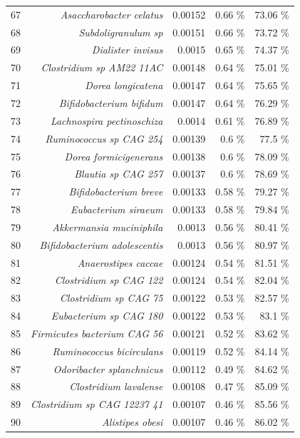 \documentclass{article}
\begin{document}
\begin{table}
\begin{centering}
\begin{tabular}{|r|r|r|r|r|}
  67 & \textit{Asaccharobacter celatus} & 0.00152 & 0.66 \% & 73.06 \% \\
  68 & \textit{Subdoligranulum sp} & 0.00151 & 0.66 \% & 73.72 \% \\
  69 & \textit{Dialister invisus} & 0.0015 & 0.65 \% & 74.37 \% \\
  70 & \textit{Clostridium sp AM22 11AC} & 0.00148 & 0.64 \% & 75.01 \% \\
  71 & \textit{Dorea longicatena} & 0.00147 & 0.64 \% & 75.65 \% \\
  72 & \textit{Bifidobacterium bifidum} & 0.00147 & 0.64 \% & 76.29 \% \\
  73 & \textit{Lachnospira pectinoschiza} & 0.0014 & 0.61 \% & 76.89 \% \\
  74 & \textit{Ruminococcus sp CAG 254} & 0.00139 & 0.6 \% & 77.5 \% \\
  75 & \textit{Dorea formicigenerans} & 0.00138 & 0.6 \% & 78.09 \% \\
  76 & \textit{Blautia sp CAG 257} & 0.00137 & 0.6 \% & 78.69 \% \\
  77 & \textit{Bifidobacterium breve} & 0.00133 & 0.58 \% & 79.27 \% \\
  78 & \textit{Eubacterium siraeum} & 0.00133 & 0.58 \% & 79.84 \% \\
  79 & \textit{Akkermansia muciniphila} & 0.0013 & 0.56 \% & 80.41 \% \\
  80 & \textit{Bifidobacterium adolescentis} & 0.0013 & 0.56 \% & 80.97 \% \\
  81 & \textit{Anaerostipes caccae} & 0.00124 & 0.54 \% & 81.51 \% \\
  82 & \textit{Clostridium sp CAG 122} & 0.00124 & 0.54 \% & 82.04 \% \\
  83 & \textit{Clostridium sp CAG 75} & 0.00122 & 0.53 \% & 82.57 \% \\
  84 & \textit{Eubacterium sp CAG 180} & 0.00122 & 0.53 \% & 83.1 \% \\
  85 & \textit{Firmicutes bacterium CAG 56} & 0.00121 & 0.52 \% & 83.62 \% \\
  86 & \textit{Ruminococcus bicirculans} & 0.00119 & 0.52 \% & 84.14 \% \\
  87 & \textit{Odoribacter splanchnicus} & 0.00112 & 0.49 \% & 84.62 \% \\
  88 & \textit{Clostridium lavalense} & 0.00108 & 0.47 \% & 85.09 \% \\
  89 & \textit{Clostridium sp CAG 12237 41} & 0.00107 & 0.46 \% & 85.56 \% \\
  90 & \textit{Alistipes obesi} & 0.00107 & 0.46 \% & 86.02 \% \\

\end{tabular}
\end{centering}
\end{table}
\end{document}
